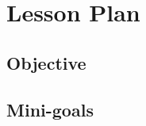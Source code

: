 \documentclass[12pt,a4paper]{article}
\begin{document}
\thispagestyle{empty}

\section*{Lesson Plan}

\subsection*{Objective}
\begin{framed}
  \hfill\vspace{3cm}
\end{framed}

\subsection*{Mini-goals}
\end{document}
